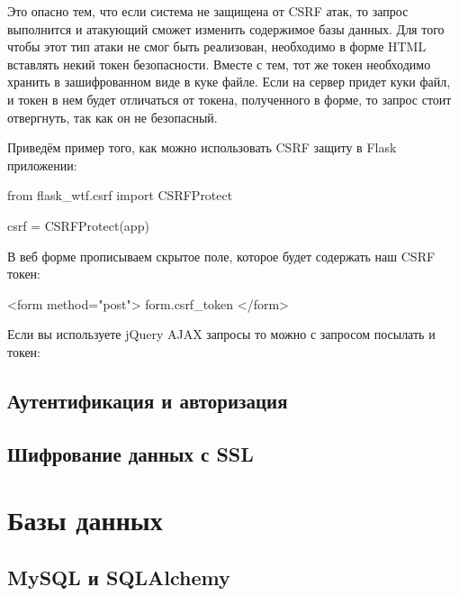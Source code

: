 Это опасно тем, что если система не защищена от CSRF атак, то 
запрос выполнится и атакующий сможет изменить содержимое базы 
данных. Для того чтобы этот тип атаки не смог быть реализован,
необходимо в форме HTML вставлять некий токен безопасности. Вместе
с тем, тот же токен необходимо хранить в зашифрованном виде в куке 
файле. Если на сервер придет куки файл, и токен в нем будет отличаться
от токена, полученного в форме, то запрос стоит отвергнуть, так как 
он не безопасный.

Приведём пример того, как можно использовать CSRF защиту в Flask 
приложении:

\begin{python}
from flask_wtf.csrf import CSRFProtect

csrf = CSRFProtect(app)
\end{python}

В веб форме прописываем скрытое поле, которое будет содержать наш CSRF токен:

\begin{python}
<form method="post">
    {{ form.csrf_token }}
</form>
\end{python}

Если вы используете jQuery AJAX запросы то можно с запросом посылать и
токен:


\subsection{Аутентификация и авторизация}

\subsection{Шифрование данных с SSL}

\section{Базы данных}

\subsection{MySQL и SQLAlchemy}

